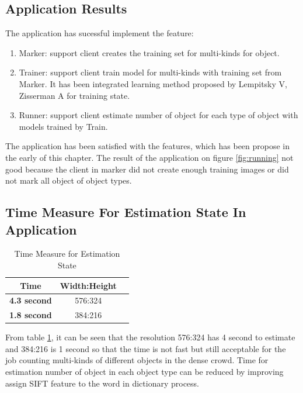   \subsection{Application Results}

  The application has sucessful implement the feature: 
  \begin{enumerate}
    \item Marker: support client creates the training set for multi-kinds for object.  
    \item Trainer: support client train model for multi-kinds with training set from Marker. It has been integrated learning method proposed by Lempitsky V, Zisserman A \cite{Lempitsky:Zisserman:Destimate} for training state.
    \item Runner: support client estimate number of object for each type of object with models trained by Train.
  \end{enumerate}
  The application has been satisfied with the features, which has been propose in the early of this chapter. The result of the application on figure \ref{fig:running} not good because the client in marker did not create enough training images or did not mark all object of object types.

  \subsection{Time Measure For Estimation State In Application}
  \begin{table}[H]
    \begin{center}
      \begin{tabular}{ | c | c | c |} 
        \hline
        \textbf{Time} & \textbf{Width:Height}  \\
        \hline
        \textbf{4.3 second} &  576:324 \\
        \hline
        \textbf{1.8 second} &  384:216  \\
        \hline
      \end{tabular}
    \end{center}
    \caption{Time Measure for Estimation State}\label{tab:timeconsier}
  \end{table}

  From table \ref{tab:timeconsier}, it can be seen that the resolution 576:324 has 4 second to estimate and 384:216 is 1 second so that the time is not fast but still acceptable for the job counting multi-kinds of different objects in the dense crowd. Time for estimation number of object in each object type can be reduced by improving assign SIFT feature to the word in dictionary process. 